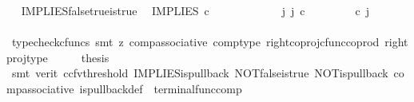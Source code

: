 \begin{isabellebody}
\isamarkupfalse%
%
\endisatagproof
{\isafoldproof}%
%
\isadelimproof
\ \isanewline
%
\endisadelimproof
\isanewline
{}\isamarkupfalse%
\ IMPLIES{\isacharunderscore}{\kern0pt}false{\isacharunderscore}{\kern0pt}true{\isacharunderscore}{\kern0pt}is{\isacharunderscore}{\kern0pt}true{\isacharcolon}{\kern0pt}\isanewline
\ \ {\isachardoublequoteopen}IMPLIES\ {\isasymcirc}\isactrlsub c\ {\isasymlangle}{\isasymf}{\isacharcomma}{\kern0pt}{\isasymt}{\isasymrangle}\ {\isacharequal}{\kern0pt}\ {\isasymt}{\isachardoublequoteclose}\isanewline
%
\isadelimproof
%
\endisadelimproof
%
\isatagproof
{}\isamarkupfalse%
\ {\isacharminus}{\kern0pt}\ \ \ \isanewline
\ \ \isamarkupfalse%
\ {\isachardoublequoteopen}{\isasymexists}\ j{\isachardot}{\kern0pt}\ j\ {\isasymin}\isactrlsub c\ {\isasymone}{\isasymCoprod}{\isacharparenleft}{\kern0pt}{\isasymone}{\isasymCoprod}{\isasymone}{\isacharparenright}{\kern0pt}\ {\isasymand}\ {\isacharparenleft}{\kern0pt}{\isasymlangle}{\isasymt}{\isacharcomma}{\kern0pt}\ {\isasymt}{\isasymrangle}{\isasymamalg}\ {\isacharparenleft}{\kern0pt}{\isasymlangle}{\isasymf}{\isacharcomma}{\kern0pt}\ {\isasymf}{\isasymrangle}\ {\isasymamalg}{\isasymlangle}{\isasymf}{\isacharcomma}{\kern0pt}\ {\isasymt}{\isasymrangle}{\isacharparenright}{\kern0pt}{\isacharparenright}{\kern0pt}\ {\isasymcirc}\isactrlsub c\ j\ \ {\isacharequal}{\kern0pt}\ {\isasymlangle}{\isasymf}{\isacharcomma}{\kern0pt}{\isasymt}{\isasymrangle}{\isachardoublequoteclose}\isanewline
\ \ \ \ \isamarkupfalse%
\ {\isacharparenleft}{\kern0pt}typecheck{\isacharunderscore}{\kern0pt}cfuncs{\isacharcomma}{\kern0pt}\ smt\ {\isacharparenleft}{\kern0pt}z{}{\isacharparenright}{\kern0pt}\ comp{\isacharunderscore}{\kern0pt}associative{}\ comp{\isacharunderscore}{\kern0pt}type\ right{\isacharunderscore}{\kern0pt}coproj{\isacharunderscore}{\kern0pt}cfunc{\isacharunderscore}{\kern0pt}coprod\ right{\isacharunderscore}{\kern0pt}proj{\isacharunderscore}{\kern0pt}type{\isacharparenright}{\kern0pt}\isanewline
\ \ \isamarkupfalse%
\ \isamarkupfalse%
\ {\isacharquery}{\kern0pt}thesis\isanewline
\ \ \ \ \isamarkupfalse%
\ {\isacharparenleft}{\kern0pt}smt\ {\isacharparenleft}{\kern0pt}verit{\isacharcomma}{\kern0pt}\ ccfv{\isacharunderscore}{\kern0pt}threshold{\isacharparenright}{\kern0pt}\ IMPLIES{\isacharunderscore}{\kern0pt}is{\isacharunderscore}{\kern0pt}pullback\ NOT{\isacharunderscore}{\kern0pt}false{\isacharunderscore}{\kern0pt}is{\isacharunderscore}{\kern0pt}true\ NOT{\isacharunderscore}{\kern0pt}is{\isacharunderscore}{\kern0pt}pullback\ comp{\isacharunderscore}{\kern0pt}associative{}\ is{\isacharunderscore}{\kern0pt}pullback{\isacharunderscore}{\kern0pt}def\ \ terminal{\isacharunderscore}{\kern0pt}func{\isacharunderscore}{\kern0pt}comp{\isacharparenright}{\kern0pt}\isanewline

\end{isabellebody}
